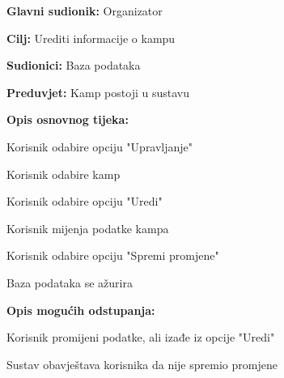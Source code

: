 					\noindent {}
					\begin{packed_item}
						
						\item \textbf{Glavni sudionik: } Organizator
						\item  \textbf{Cilj:} Urediti informacije o kampu
						\item  \textbf{Sudionici:} Baza podataka
						\item  \textbf{Preduvjet:} Kamp postoji u sustavu
						\item  \textbf{Opis osnovnog tijeka:}
						
						\item[] \begin{packed_enum}
								
							\item Korisnik odabire opciju "Upravljanje"
							\item Korisnik odabire kamp
							\item Korisnik odabire opciju "Uredi"
							\item Korisnik mijenja podatke kampa
							\item Korisnik odabire opciju "Spremi promjene"
							\item Baza podataka se ažurira
						\end{packed_enum}
						
						\item  \textbf{Opis mogućih odstupanja:}
						
						\item[] \begin{packed_item}
							
							\item[5.a] Korisnik promijeni podatke, ali izađe iz opcije "Uredi"
							\item[] \begin{packed_enum}
								
								\item Sustav obavještava korisnika da nije spremio promjene
								
							\end{packed_enum}
	
							
						\end{packed_item}
					\end{packed_item}
				
